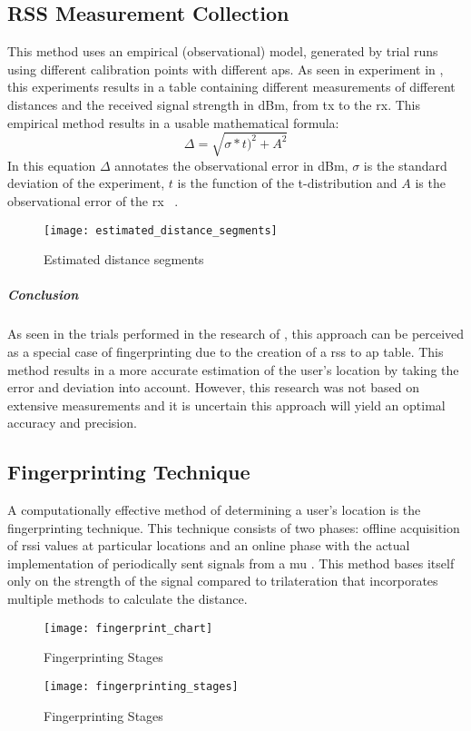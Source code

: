 \subsection{RSS Measurement Collection}
This method uses an empirical (observational) model, generated by trial runs using different calibration points with different \acrlong{ap}s. As seen in experiment in \cite{Shchekotov}, this experiments results in a table containing different measurements of different distances and the received signal strength in dBm, from \acrlong{tx} to the \acrlong{rx}. This empirical method results in a usable mathematical formula:
\[
\Delta = \sqrt{\sigma * t)^2 + A^2}
\]
In this equation $\Delta$ annotates the observational error in dBm, $\sigma$ is the standard deviation of the experiment, $t$ is the function of the t-distribution and $A$ is the observational error of the \acrfull{rx} ~\cite[p.178]{Shchekotov}.
\begin{figure}[h!]
\centering
\texttt{[image: estimated\_distance\_segments]}
\caption{Estimated distance segments ~\cite[p.179]{Shchekotov}}
\label{fig:estimated_distance_segments}
\end{figure}
\subparagraph{Conclusion}
As seen in the trials performed in the research of \cite{Shchekotov}, this approach can be perceived as a special case of fingerprinting due to the creation of a \acrshort{rss} to \acrshort{ap} table. This method results in a more accurate estimation of the user's location by taking the error and deviation into account. However, this research was not based on extensive measurements and it is uncertain this approach will yield an optimal accuracy and precision.
\subsection{Fingerprinting Technique}
A computationally effective method of determining a user's location is the fingerprinting technique. This technique consists of two phases: offline acquisition of \acrshort{rssi} values at particular locations and an online phase with the actual implementation of periodically sent signals from a \acrshort{mu} \cite[p.~9]{Retscher}. This method bases itself only on the strength of the signal compared to trilateration that incorporates multiple methods to calculate the distance.
\begin{figure}[h!]
\centering
\texttt{[image: fingerprint\_chart]}
\caption{Fingerprinting Stages ~\cite[p.11]{S2016}}
\label{fig:fingerprint_chart}
\end{figure}
\begin{figure}[h!]
\centering
\texttt{[image: fingerprinting\_stages]}
\caption{Fingerprinting Stages ~\cite[p.2]{Li}}
\label{fig:fingerprint_stages}
\end{figure}
